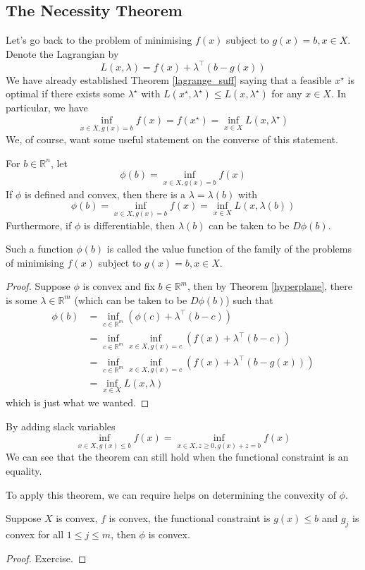 \subsection{The Necessity Theorem}
Let's go back to the problem of minimising $f(x)$ subject to $g(x)=b,x\in X$.
Denote the Lagrangian by
$$L(x,\lambda)=f(x)+\lambda^\top(b-g(x))$$
We have already established Theorem \ref{lagrange_suff} saying that a feasible $x^\star$ is optimal if there exists some $\lambda^\star$ with $L(x^\star,\lambda^\star)\le L(x,\lambda^\star)$ for any $x\in X$.
In particular, we have
$$\inf_{x\in X,g(x)=b}f(x)=f(x^\star)=\inf_{x\in X}L(x,\lambda^\star)$$
We, of course, want some useful statement on the converse of this statement.
\begin{theorem}\label{lagrange_nece}
    For $b\in\mathbb R^n$, let
    $$\phi(b)=\inf_{x\in X,g(x)=b}f(x)$$
    If $\phi$ is defined and convex, then there is a $\lambda=\lambda(b)$ with
    $$\phi(b)=\inf_{x\in X,g(x)=b}f(x)=\inf_{x\in X}L(x,\lambda(b))$$
    Furthermore, if $\phi$ is differentiable, then $\lambda(b)$ can be taken to be $D\phi(b)$.
\end{theorem}
\begin{definition}
    Such a function $\phi(b)$ is called the value function of the family of the problems of minimising $f(x)$ subject to $g(x)=b,x\in X$.
\end{definition}
\begin{proof}
    Suppose $\phi$ is convex and fix $b\in\mathbb R^m$, then by Theorem \ref{hyperplane}, there is some $\lambda\in\mathbb R^m$ (which can be taken to be $D\phi(b)$) such that
    \begin{align*}
        \phi(b)&=\inf_{c\in\mathbb R^m}(\phi(c)+\lambda^\top(b-c))\\
        &=\inf_{c\in\mathbb R^m}\inf_{x\in X,g(x)=c}(f(x)+\lambda^\top(b-c))\\
        &=\inf_{c\in\mathbb R^m}\inf_{x\in X,g(x)=c}(f(x)+\lambda^\top(b-g(x)))\\
        &=\inf_{x\in X}L(x,\lambda)
    \end{align*}
    which is just what we wanted.
\end{proof}
\begin{remark}
    By adding slack variables
    $$\inf_{x\in X,g(x)\le b}f(x)=\inf_{x\in X,z\ge 0,g(x)+z=b}f(x)$$
    We can see that the theorem can still hold when the functional constraint is an equality.
\end{remark}
To apply this theorem, we can require helps on determining the convexity of $\phi$.
\begin{theorem}
    Suppose $X$ is convex, $f$ is convex, the functional constraint is $g(x)\le b$ and $g_j$ is convex for all $1\le j\le m$, then $\phi$ is convex.
\end{theorem}
\begin{proof}
    Exercise.
\end{proof}
